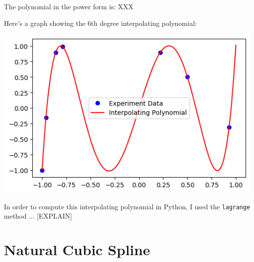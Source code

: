 \documentclass{article}
\newcommand{\code}{\texttt}
\begin{document}
The polynomial in the power form is: XXX

Here's a graph showing the 6th degree interpolating polynomial:

\includegraphics{intpoly}

In order to compute this interpolating polynomial in Python, I used the \code{lagrange} method ... [EXPLAIN]

\section{Natural Cubic Spline}
\end{document}
